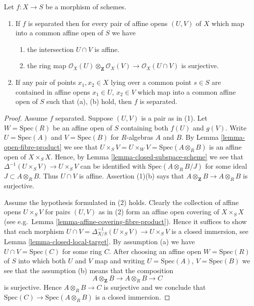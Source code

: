\begin{lemma}
\label{lemma-characterize-separated}
Let $f : X \to S$ be a morphism of schemes.
\begin{enumerate}
\item If $f$ is separated then for every pair of affine
opens $(U, V)$ of $X$ which map into a
common affine open of $S$ we have
\begin{enumerate}
\item the intersection $U \cap V$ is affine.
\item the ring map
$\mathcal{O}_X(U) \otimes_{\mathbf{Z}} \mathcal{O}_X(V)
\to \mathcal{O}_X(U \cap V)$
is surjective.
\end{enumerate}
\item If any pair of points $x_1, x_2 \in X$ lying over a common
point $s \in S$ are contained in affine opens $x_1 \in U$,
$x_2 \in V$ which map into a common affine open of $S$ such
that (a), (b) hold, then $f$ is separated.
\end{enumerate}
\end{lemma}

\begin{proof}
Assume $f$ separated. Suppose $(U, V)$ is a pair as in (1).
Let $W = \text{Spec}(R)$ be an affine open of $S$ containing
both $f(U)$ and $g(V)$. Write $U = \text{Spec}(A)$ and
$V = \text{Spec}(B)$ for $R$-algebras $A$ and $B$.
By Lemma \ref{lemma-open-fibre-product} we see that
$U \times_S V = U \times_W V = \text{Spec}(A \otimes_R B)$
is an affine open of $X \times_S X$. Hence, by
Lemma \ref{lemma-closed-subspace-scheme} we see that
$\Delta^{-1}(U \times_S V) \to U \times_S V$
can be identified with $\text{Spec}(A \otimes_R B/J)$
for some ideal $J \subset A \otimes_R B$.
Thus $U \cap V$ is affine. Assertion (1)(b) says that
$A \otimes_{\mathbf{Z}} B \to A \otimes_R B$ is surjective.

\medskip\noindent
Assume the hypothesis formulated in (2) holds.
Clearly the collection of affine opens $U \times_S V$
for pairs $(U, V)$ as in (2) form an affine open covering
of $X \times_S X$ (see e.g.\ Lemma \ref{lemma-affine-covering-fibre-product}).
Hence it suffices to show that each morphism
$U \cap V = \Delta_{X/S}^{-1}(U \times_S V) \to U\times_S V$
is a closed immersion, see Lemma \ref{lemma-closed-local-target}.
By assumption (a) we have $U \cap V = \text{Spec}(C)$ for some ring $C$.
After choosing an affine open $W = \text{Spec}(R)$ of $S$
into which both $U$ and $V$ map and writing $U = \text{Spec}(A)$,
$V = \text{Spec}(B)$ we see that the assumption (b) means
that the composition
$$
A \otimes_{\mathbf{Z}} B \to A \otimes_R B \to C
$$
is surjective. Hence $A \otimes_R B \to C$ is surjective and
we conclude that $\text{Spec}(C) \to \text{Spec}(A \otimes_R B)$
is a closed immersion.
\end{proof}

